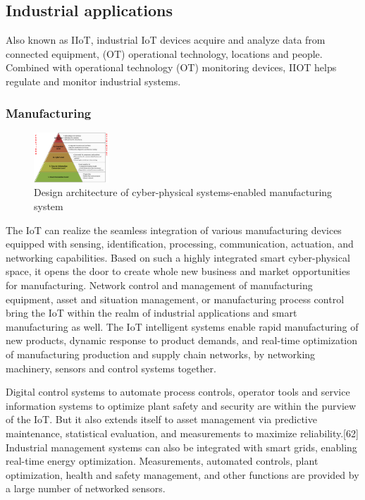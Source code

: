 \documentclass[12pt, a4paper, twoside]{article}
\begin{document}
\subsection{Industrial applications}
Also known as IIoT, industrial IoT devices acquire and analyze data from connected equipment, (OT) operational technology, locations and people. Combined with operational technology (OT) monitoring devices, IIOT helps regulate and monitor industrial systems.

\subsubsection{Manufacturing}
\begin{figure} %
    \centering
    \includegraphics[width=0.25\textwidth]{mnf}
    \caption{Design architecture of cyber-physical systems-enabled manufacturing system}
\end{figure}
The IoT can realize the seamless integration of various manufacturing devices equipped with sensing, identification, processing, communication, actuation, and networking capabilities. Based on such a highly integrated smart cyber-physical space, it opens the door to create whole new business and market opportunities for manufacturing. Network control and management of manufacturing equipment, asset and situation management, or manufacturing process control bring the IoT within the realm of industrial applications and smart manufacturing as well. The IoT intelligent systems enable rapid manufacturing of new products, dynamic response to product demands, and real-time optimization of manufacturing production and supply chain networks, by networking machinery, sensors and control systems together.

Digital control systems to automate process controls, operator tools and service information systems to optimize plant safety and security are within the purview of the IoT. But it also extends itself to asset management via predictive maintenance, statistical evaluation, and measurements to maximize reliability.[62] Industrial management systems can also be integrated with smart grids, enabling real-time energy optimization. Measurements, automated controls, plant optimization, health and safety management, and other functions are provided by a large number of networked sensors.
\end{document}
